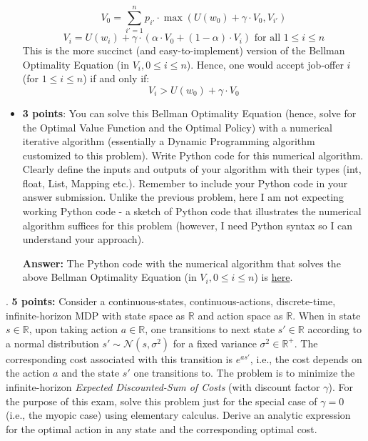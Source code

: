 \documentclass[12pt]{exam}
\begin{document}
\begin{questions}
\begin{itemize}
$$V_0 = \sum_{i'=1}^n p_{i'} \cdot \max(U(w_0) + \gamma \cdot V_0, V_{i'})$$
$$V_i = U(w_i) + \gamma \cdot (\alpha \cdot V_0 + (1 - \alpha) \cdot V_i) \text{ for all } 1 \leq i \leq n$$
This is the more succinct (and easy-to-implement) version of the Bellman Optimality Equation (in $V_i, 0 \leq i \leq n$).
Hence, one would accept job-offer $i$ (for $1 \leq i \leq n$) if and only if:
$$V_i > U(w_0) + \gamma \cdot V_0$$

\item {\bf 3 points}: You can solve this Bellman Optimality Equation (hence, solve for the Optimal Value Function and the Optimal Policy) with a numerical iterative algorithm (essentially a Dynamic Programming algorithm customized to this problem). Write Python code for this numerical algorithm. Clearly define the inputs and outputs of your algorithm with their types (int, float, List, Mapping etc.). Remember to include your Python code in your answer submission. Unlike the previous problem, here I am not expecting working Python code - a sketch of Python code that illustrates the numerical algorithm suffices for this problem (however, I need Python syntax so I can understand your approach).

{\bf Answer:} The Python code with the numerical algorithm that solves the above Bellman Optimality Equation (in $V_i, 0 \leq i \leq n$) is \href{https://github.com/coverdrive/MDP-DP-RL/blob/master/src/examples/wage_max.py}{here}.

\end{itemize}

. {\bf 5 points:} Consider a continuous-states, continuous-actions, discrete-time, infinite-horizon MDP with state space as $\mathbb{R}$ and action space as $\mathbb{R}$. When in state $s\in \mathbb{R}$, upon taking action $a\in \mathbb{R}$, one transitions to next state $s' \in \mathbb{R}$ according to a normal distribution $s' \sim \mathcal{N}(s, \sigma^2)$ for a fixed variance $\sigma^2 \in \mathbb{R}^+$. The corresponding cost associated with this transition is $e^{as'}$, i.e., the cost depends on the action $a$ and the state $s'$ one transitions to. The problem is to minimize the  infinite-horizon {\em Expected Discounted-Sum of Costs} (with discount factor $\gamma$). For the purpose of this exam, solve this problem just for the special case of $\gamma = 0$ (i.e., the myopic case) using elementary calculus. Derive an analytic expression for the optimal action in any state and the corresponding optimal cost.


\end{questions}
\end{document}
